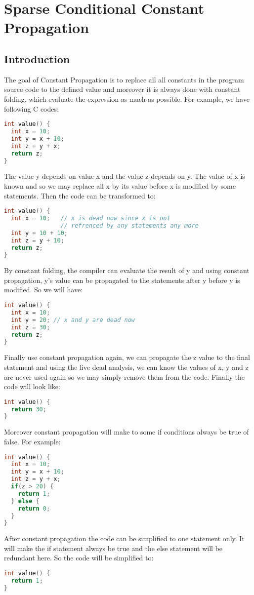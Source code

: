 \chapter{Sparse Conditional Constant Propagation}

\section{Introduction}
The goal of Constant Propagation is to replace all all constants in the program source code to the defined value and moreover it is always done with constant folding, which evaluate the expression as much as possible. For example, we have following C codes:
\begin{lstlisting}[language=c]
int value() {
  int x = 10;
  int y = x + 10;
  int z = y + x;
  return z;
}
\end{lstlisting}
The value y depends on value x and the value z depends on y. The value of x is known and so we may replace all x by its value before x is modified by some statements. Then the code can be transformed to:
\begin{lstlisting}[language=c]
int value() {
  int x = 10;   // x is dead now since x is not
                // refrenced by any statements any more
  int y = 10 + 10;
  int z = y + 10;
  return z;
}
\end{lstlisting}
By constant folding, the compiler can evaluate the result of y and using constant propagation, y’s value can be propagated to the statements after y before y is modified. So we will have:
\begin{lstlisting}[language=c]
int value() {
  int x = 10;
  int y = 20; // x and y are dead now
  int z = 30;
  return z;
}
\end{lstlisting}
Finally use constant propagation again, we can propagate the z value to the final statement and using the live dead analysis, we can know the values of x, y and z are never used again so we may simply remove them from the code. Finally the code will look like:
\begin{lstlisting}[language=c]
int value() {
  return 30;
}
\end{lstlisting}
Moreover constant propagation will make to some if conditions always be true of false. For example:
\begin{lstlisting}[language=c]
int value() {
  int x = 10;
  int y = x + 10;
  int z = y + x;
  if(z > 20) {
    return 1;
  } else {
    return 0;
  }
}
\end{lstlisting}
After constant propagation the code can be simplified to one statement only. It will make the if statement always be true and the else statement will be redundant here. So the code will be simplified to:
\begin{lstlisting}[language=c]
int value() {
  return 1;
}
\end{lstlisting}


